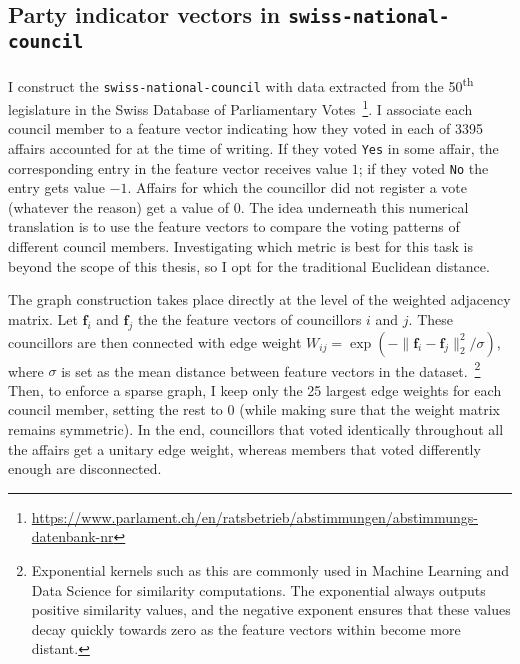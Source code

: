 \subsection{Party indicator vectors in \texttt{swiss-national-council}}

I construct the \texttt{swiss-national-council} with data extracted from the 50\textsuperscript{th} legislature in the Swiss Database of Parliamentary Votes~\footnote{\url{https://www.parlament.ch/en/ratsbetrieb/abstimmungen/abstimmungs-datenbank-nr}}. I associate each council member to a feature vector indicating how they voted in each of 3395 affairs accounted for at the time of writing. If they voted \texttt{Yes} in some affair, the corresponding entry in the feature vector receives value $1$; if they voted \texttt{No} the entry gets value $-1$. Affairs for which the councillor did not register a vote (whatever the reason) get a value of $0$. The idea underneath this numerical translation is to use the feature vectors to compare the voting patterns of different council members. Investigating which metric is best for this task is beyond the scope of this thesis, so I opt for the traditional Euclidean distance.

The graph construction takes place directly at the level of the weighted adjacency matrix. Let $\mathbf{f}_i$ and $\mathbf{f}_j$ the the feature vectors of councillors $i$ and $j$. These councillors are then connected with edge weight $W_{ij} = \exp \left ( -\| \mathbf{f}_i - \mathbf{f}_j \|_2^2 / \sigma \right )$, where $\sigma$ is set as the mean distance between feature vectors in the dataset.~\footnote{Exponential kernels such as this are commonly used in Machine Learning and Data Science for similarity computations. The exponential always outputs positive similarity values, and the negative exponent ensures that these values decay quickly towards zero as the feature vectors within become more distant.} Then, to enforce a sparse graph, I keep only the 25 largest edge weights for each council member, setting the rest to $0$ (while making sure that the weight matrix remains symmetric). In the end, councillors that voted identically throughout all the affairs get a unitary edge weight, whereas members that voted differently enough are disconnected.

